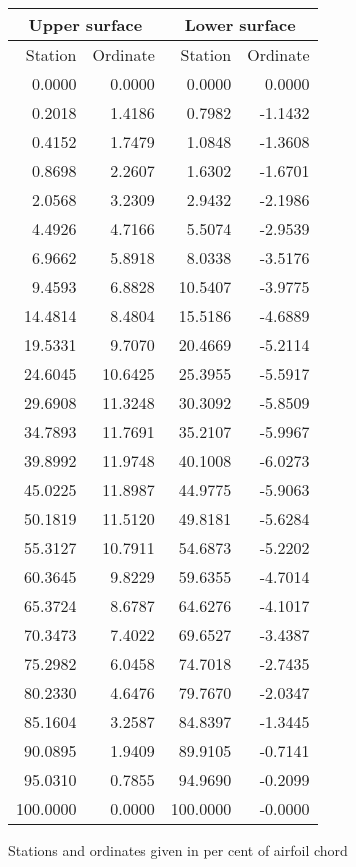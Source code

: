 \documentclass[11pt]{book}
\begin{document}
 \hspace{4mm}
 \begin{tabular}{|r|r|r|r|} \hline 
 \multicolumn{2}{|c|}{Upper surface} & \multicolumn{2}{|c|}{Lower surface} \\
 \hline
 Station & Ordinate & Station & Ordinate \\
 \hline
0.0000 & 0.0000 & 0.0000 & 0.0000 \\
0.2018 & 1.4186 & 0.7982 & -1.1432 \\
0.4152 & 1.7479 & 1.0848 & -1.3608 \\
0.8698 & 2.2607 & 1.6302 & -1.6701 \\
2.0568 & 3.2309 & 2.9432 & -2.1986 \\
4.4926 & 4.7166 & 5.5074 & -2.9539 \\
6.9662 & 5.8918 & 8.0338 & -3.5176 \\
9.4593 & 6.8828 & 10.5407 & -3.9775 \\
14.4814 & 8.4804 & 15.5186 & -4.6889 \\
19.5331 & 9.7070 & 20.4669 & -5.2114 \\
24.6045 & 10.6425 & 25.3955 & -5.5917 \\
29.6908 & 11.3248 & 30.3092 & -5.8509 \\
34.7893 & 11.7691 & 35.2107 & -5.9967 \\
39.8992 & 11.9748 & 40.1008 & -6.0273 \\
45.0225 & 11.8987 & 44.9775 & -5.9063 \\
50.1819 & 11.5120 & 49.8181 & -5.6284 \\
55.3127 & 10.7911 & 54.6873 & -5.2202 \\
60.3645 & 9.8229 & 59.6355 & -4.7014 \\
65.3724 & 8.6787 & 64.6276 & -4.1017 \\
70.3473 & 7.4022 & 69.6527 & -3.4387 \\
75.2982 & 6.0458 & 74.7018 & -2.7435 \\
80.2330 & 4.6476 & 79.7670 & -2.0347 \\
85.1604 & 3.2587 & 84.8397 & -1.3445 \\
90.0895 & 1.9409 & 89.9105 & -0.7141 \\
95.0310 & 0.7855 & 94.9690 & -0.2099 \\
100.0000 & 0.0000 & 100.0000 & -0.0000 \\
 \hline 
 \end{tabular}
 \vspace{8mm}

Stations and ordinates given in per cent of airfoil chord
\end{document}
